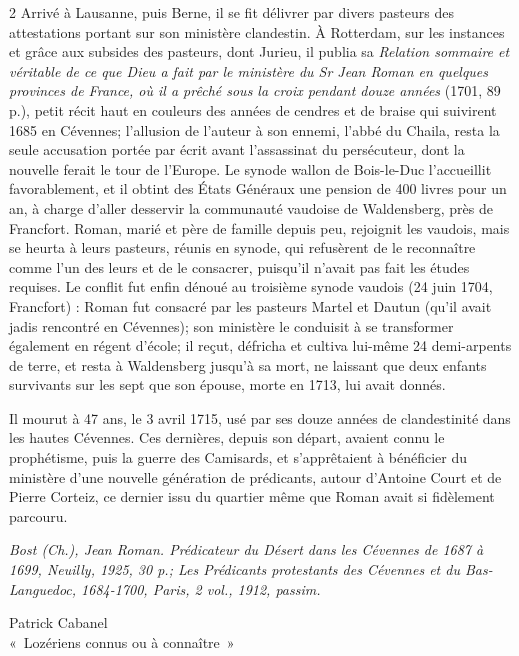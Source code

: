 {\begin{multicols}{2}
Arrivé à Lausanne, puis Berne, il se fit délivrer par divers pasteurs des attestations portant sur son ministère clandestin. À Rotterdam, sur les instances et grâce aux subsides des pasteurs, dont Jurieu, il publia sa \textit{Relation sommaire et véritable de ce que Dieu a fait par le ministère du Sr Jean Roman en quelques provinces de France, où il a prêché sous la croix pendant douze années} (1701, 89 p.), petit récit haut en couleurs des années de cendres et de braise qui suivirent 1685 en Cévennes; l’allusion de l’auteur à son ennemi, l’abbé du Chaila, resta la seule accusation portée par écrit avant l’assassinat du persécuteur, dont la nouvelle ferait le tour de l’Europe. Le synode wallon de Bois-le-Duc l’accueillit favorablement, et il obtint des États Généraux une pension de 400 livres pour un an, à charge d’aller desservir la communauté vaudoise de Waldensberg, près de Francfort. Roman, marié et père de famille depuis peu, rejoignit les vaudois, mais se heurta à leurs pasteurs, réunis en synode, qui refusèrent de le reconnaître comme l’un des leurs et de le consacrer, puisqu’il n’avait pas fait les études requises. Le conflit fut enfin dénoué au troisième synode vaudois (24 juin 1704, Francfort) : Roman fut consacré par les pasteurs Martel et Dautun (qu’il avait jadis rencontré en Cévennes); son ministère le conduisit à se transformer également en régent d’école; il reçut, défricha et cultiva lui-même 24 demi-arpents de terre, et resta à Waldensberg jusqu’à sa mort, ne laissant que deux enfants survivants sur les sept que son épouse, morte en 1713, lui avait donnés.

Il mourut à 47 ans, le 3 avril 1715, usé par ses douze années de clandestinité dans les hautes Cévennes. Ces dernières, depuis son départ, avaient connu le prophétisme, puis la guerre des Camisards, et s’apprêtaient à bénéficier du ministère d’une nouvelle génération de prédicants, autour d’Antoine Court et de Pierre Corteiz, ce dernier issu du quartier même que Roman avait si fidèlement parcouru.

\vspace{0.35em}

\textit{Bost (Ch.), Jean Roman. Prédicateur du Désert dans les Cévennes de 1687 à 1699, Neuilly, 1925, 30 p.; Les Prédicants protestants des Cévennes et du Bas-Languedoc, 1684-1700, Paris, 2 vol., 1912, passim.}

\begin{flushright}
Patrick Cabanel\\[-0.1em]
«~Lozériens connus ou à connaître~»
\end{flushright}

\end{multicols}
}


